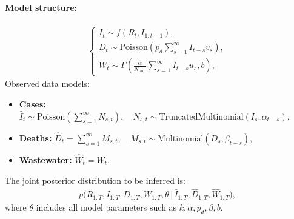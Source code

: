 \documentclass{article}
\begin{document}
\paragraph{Model structure:}

\begin{align}
\begin{cases}
I_t \sim f(R_t, I_{1:t-1}), \\[6pt]
D_t \sim \mathrm{Poisson}\left(p_d \sum_{s=1}^\infty I_{t-s} v_s \right), \\[6pt]
W_t \sim \Gamma\left(\frac{\alpha}{N_{\mathrm{pop}}} \sum_{s=1}^\infty I_{t-s} u_s, b \right),
\end{cases}
\end{align}
Observed data models:
\begin{itemize}
    \item \textbf{Cases:} $\widehat{I}_t \sim \mathrm{Poisson}\left(\sum_{s=1}^\infty N_{s,t}\right), \quad N_{s,t} \sim \mathrm{TruncatedMultinomial}(I_s, \alpha_{t-s})$,
    \item \textbf{Deaths:} $\widehat{D}_t = \sum_{s=1}^\infty M_{s,t}, \quad M_{s,t} \sim \mathrm{Multinomial}(D_s, \beta_{t-s})$,
    \item \textbf{Wastewater:} $\widehat{W}_t = W_t$.
\end{itemize}
The joint posterior distribution to be inferred is:
\begin{align}
p\big(R_{1:T}, I_{1:T}, D_{1:T}, W_{1:T}, \theta \,\big|\, \widehat{I}_{1:T}, \widehat{D}_{1:T}, \widehat{W}_{1:T}\big),
\end{align}
where $\theta$ includes all model parameters such as $k, \alpha, p_d, \beta, b$.



\end{document}
